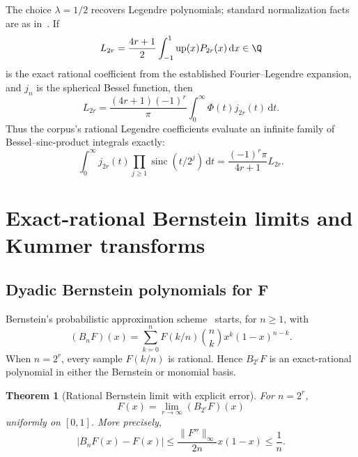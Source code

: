 \documentclass[11pt,oneside]{article}
\newtheorem{theorem}{Theorem}[section]
\theoremstyle{definition}
\newcommand{\dd}{\,\mathrm d}
\newcommand{\Up}{\operatorname{up}}
\newcommand{\sinc}{\operatorname{sinc}}
\begin{document}
The choice $\lambda=1/2$ recovers Legendre polynomials; standard normalization facts are as in~\cite{p5:szego1975}.  If
\begin{equation}
 L_{2r}=\frac{4r+1}{2}\int_{-1}^{1}\Up(x)P_{2r}(x)\dd x \in\Q          \label{p5:eq:legendre-coeff}
\end{equation}
is the exact rational coefficient from the established Fourier--Legendre
expansion, and $j_n$ is the spherical Bessel function, then
\begin{equation}
 \boxed{\displaystyle
 L_{2r}=\frac{(4r+1)(-1)^r}{\pi}
 \int_0^\infty\Phi(t)j_{2r}(t)\dd t.}                   \label{p5:eq:legendre-bessel}
\end{equation}
Thus the corpus's rational Legendre coefficients evaluate an infinite family
of Bessel--sinc-product integrals exactly:
\begin{equation}
 \int_0^\infty j_{2r}(t)
 \prod_{j\ge1}\sinc(t/2^j)\dd t
 =\frac{(-1)^r\pi}{4r+1}L_{2r}.                         \label{p5:eq:rational-bessel-integrals}
\end{equation}

\section{Exact-rational Bernstein limits and Kummer transforms}
\label{p5:sec:bernstein}

\subsection{Dyadic Bernstein polynomials for F}

Bernstein's probabilistic approximation scheme~\cite{p5:bernstein1912} starts, for $n\ge1$, with
\begin{equation}
 (B_nF)(x)=\sum_{k=0}^{n}F(k/n)\binom nkx^k(1-x)^{n-k}.  \label{p5:eq:bernstein-F}
\end{equation}
When $n=2^r$, every sample $F(k/n)$ is rational.  Hence $B_{2^r}F$ is an
exact-rational polynomial in either the Bernstein or monomial basis.

\begin{theorem}[Rational Bernstein limit with explicit error]
\label{p5:thm:bernstein-F}
For $n=2^r$,
\begin{equation}
 \boxed{\displaystyle
 F(x)=\lim_{r\to\infty}(B_{2^r}F)(x)}                   \label{p5:eq:bernstein-limit}
\end{equation}
uniformly on $[0,1]$.  More precisely,
\begin{equation}
 |B_nF(x)-F(x)|
 \le\frac{\|F''\|_\infty}{2n}x(1-x)
 \le\frac1n.                                            \label{p5:eq:bernstein-error}
\end{equation}
\end{theorem}
\end{document}
